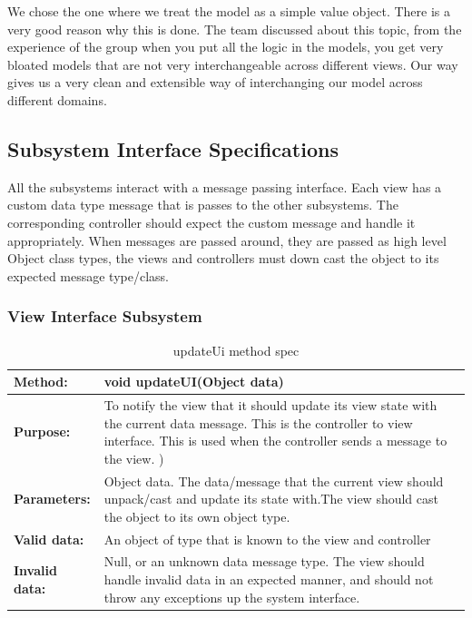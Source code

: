 \documentclass[12pt]{article}
\begin{document}
We chose the one where we treat the model as a simple value object. There is a very good reason why this is done. The team discussed about this topic, from the experience of the group when you put all the logic in the models, you get very bloated models that are not very interchangeable across different views. Our way gives us a very clean and extensible way of interchanging our model across different domains. 



\subsection{Subsystem Interface Specifications}
All the subsystems interact with a message passing interface. Each view has a custom data type message that is passes to the other subsystems. The corresponding controller should expect the custom message and handle it appropriately. When messages are passed around, they are passed as high level Object class types, the views and controllers must down cast the object to its expected message type/class.

\subsubsection{View Interface Subsystem}

\begin{table}[H]
  \caption{updateUi method spec}
  \begin{center}
    \begin{tabular}{|l|p{10cm}|}

      \hline
      \bf Method: & void updateUI(Object data)\\
		\hline
      \bf Purpose: & To notify the view that it should update its view state with the current data message.
This is the controller to view interface. This is used when the controller sends a message to the view.
)\\
\hline
      \bf Parameters: & Object data. The data/message that the current view should unpack/cast and update its state with.The view should cast the object to its own object type.\\
		\hline
      \bf Valid data: &  An object of type that is known to the view and controller\\
      \hline
      \bf Invalid data: &  Null, or an unknown data message type. The view should handle invalid data in an expected manner, and should not throw any exceptions up the system interface.\\
      \hline

    \end{tabular}
  \end{center}
\end{table}
\end{document}

